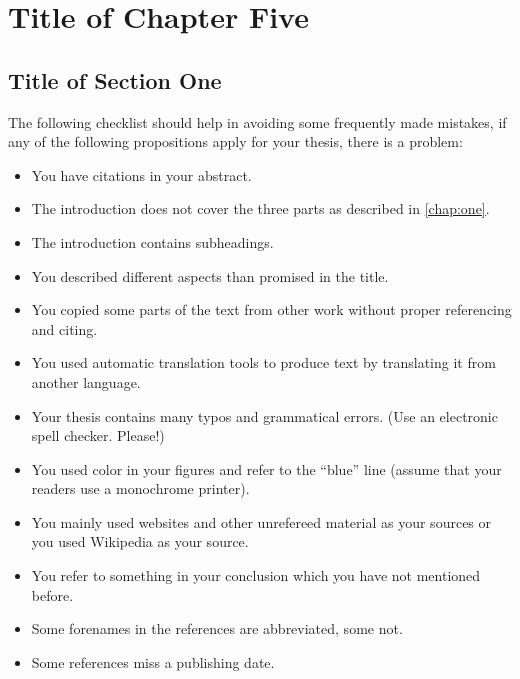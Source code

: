 \chapter{Title of Chapter Five}
\label{chap:five}

\section{Title of Section One}

The following checklist should help in avoiding some frequently made mistakes, if any of the following propositions apply for your thesis, there is a problem:

\begin{itemize} 
		\item You have citations in your abstract.
		\item The introduction does not cover the three parts as described in \autoref{chap:one}.
		\item The introduction contains subheadings.
		\item You described different aspects than promised in the title.
		\item You copied some parts of the text from other work without proper referencing and citing.
		\item You used automatic translation tools to produce text by translating it from another language.
		\item Your thesis contains many typos and grammatical errors. (Use an electronic spell checker. Please!)
		\item You used color in your figures and refer to the ``blue'' line (assume that your readers use a monochrome printer).
		\item You mainly used websites and other unrefereed material as your sources or you used Wikipedia as your source.
		\item You refer to something in your conclusion which you have not mentioned before.
		\item Some forenames in the references are abbreviated, some not.
		\item Some references miss a publishing date.
\end{itemize}


